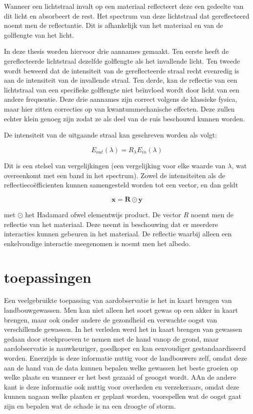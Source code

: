 \documentclass[12pt]{report}
\begin{document}
Wanneer een lichtstraal invalt op een materiaal reflecteert deze een gedeelte van dit licht en absorbeert de rest. Het spectrum van deze lichtstraal dat gereflecteerd noemt men de reflectantie. Dit is afhankelijk van het materiaal en van de golflengte van het licht. 

In deze thesis worden hiervoor drie aannames gemaakt. Ten eerste heeft de gereflecteerde lichtstraal dezelfde golflengte als het invallende licht. Ten tweede wordt beweerd dat de intensiteit van de gereflecteerde straal recht evenredig is aan de intensiteit van de invallende straal. Ten derde, kan de reflectie van een lichtstraal van een specifieke golflengte niet be\"invloed wordt door licht van een andere frequentie. Deze drie aannames zijn correct volgens de klassieke fysica, maar hier zitten correcties op van kwantummechanische effecten. Deze zullen echter klein genoeg zijn zodat ze als deel van de ruis beschouwd kunnen worden.

De intensiteit van de uitgaande straal kan geschreven worden als volgt:

\begin{equation}
E_{out}(\lambda) = R_\lambda E_{in}(\lambda)
\end{equation}

Dit is een stelsel van vergelijkingen (een vergelijking voor elke waarde van $\lambda$, wat overeenkomt met een band in het spectrum). Zowel de intensiteiten als de reflectieco\"efficienten kunnen samengesteld worden tot een vector, en dan geldt

\begin{equation}
\bm{x} = \bm{R}\odot \bm{y}
\end{equation}

met $\odot$ het Hadamard ofwel elementwijs product. De vector $R$ noemt men de reflectie van het materiaal. Deze neemt in beschouwing dat er meerdere interacties kunnen gebeuren in het materiaal. De reflectie waarbij alleen een enkelvoudige interactie meegenomen is noemt men het albedo.


\section{toepassingen}


Een veelgebruikte toepassing van aardobservatie is het in kaart brengen van landbouwgewassen\cite{fun}. Men kan niet alleen het soort gewas op een akker in kaart brengen, maar ook onder andere de gezondheid en verwachte oogst van verschillende gewassen. In het verleden werd het in kaart brengen van gewassen gedaan door steekproeven te nemen met de hand vanop de grond, maar aardobservatie is nauwkeuriger, goedkoper en kan eenvoudiger gestandaardiseerd worden. Enerzijds is deze informatie nuttig voor de landbouwers zelf, omdat deze aan de hand van de data kunnen bepalen welke gewassen het beste groeien op welke plaats en wanneer er het best gezaaid of geoogst wordt. AAn de andere kant is deze informatie ook nuttig voor overheden en verzekeraars, omdat deze kunnen nagaan welke planten er geplant worden,  voorspellen wat de oogst gaat zijn en bepalen wat de schade is na een droogte of storm. 
\end{document}
